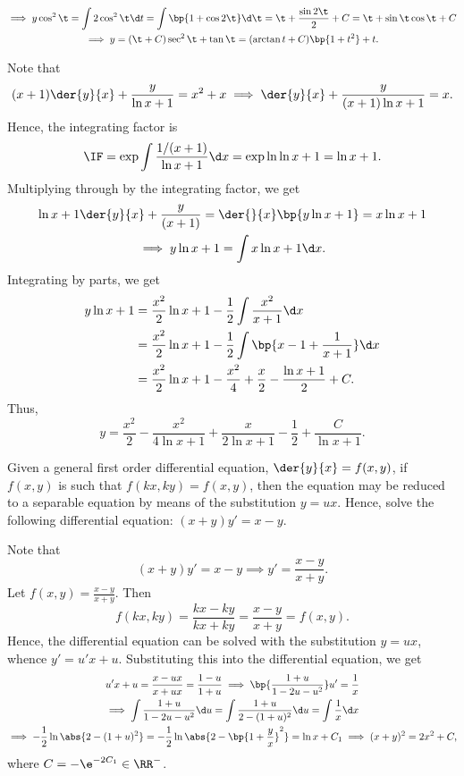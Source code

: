 \begin{solution}
\begin{ppart}
\begin{gather*}
            \implies y \cos^2 \t = \int 2\cos^2 \t \d t = \int \bp{1 + \cos 2\t} \d \t = \t + \frac{\sin 2\t}{2} + C = \t + \sin \t \cos \t + C\\
            \implies y = (\t + C)\sec^2 \t + \tan \t = (\arctan t + C)\bp{1 + t^2} + t.
        \end{gather*}
    \end{ppart}
    \begin{ppart}
        Note that \[(x+1)\der{y}{x} + \frac{y}{\ln{x+1}} = x^2 + x \implies \der{y}{x} + \frac{y}{(x+1)\ln{x+1}} = x.\] Hence, the integrating factor is \[\IF = \exp \int \frac{1/(x+1)}{\ln{x+1}} \d x = \exp \ln \ln{x+1} = \ln{x+1}.\] Multiplying through by the integrating factor, we get
        \begin{gather*}
            \ln{x+1} \der{y}{x} + \frac{y}{(x+1)} = \der{}{x} \bp{y\ln{x+1}} = x\ln{x+1}\\
            \implies y\ln{x+1} = \int x\ln{x+1} \d x.
        \end{gather*}
        Integrating by parts, we get
        \begin{align*}
            y \ln{x+1} &= \frac{x^2}2 \ln{x+1} - \frac12 \int \frac{x^2}{x+1} \d x \\
            &= \frac{x^2}2 \ln{x+1} - \frac12 \int \bp{x - 1 + \frac1{x+1}} \d x \\
            &= \frac{x^2}2 \ln{x+1} - \frac{x^2}4 + \frac{x}2 - \frac{\ln{x+1}}2 + C.
        \end{align*}
        Thus, \[y = \frac{x^2}2  - \frac{x^2}{4\ln{x+1}} + \frac{x}{2\ln{x+1}} - \frac12 + \frac{C}{\ln{x+1}}.\]
    \end{ppart}
\end{solution}

\begin{problem}
    Given a general first order differential equation, $\der{y}{x} = f(x, y)$, if $f(x, y)$ is such that $f(kx, ky) = f(x, y)$, then the equation may be reduced to a separable equation by means of the substitution $y = ux$. Hence, solve the following differential equation: $(x+y)y' = x-y$.
\end{problem}
\begin{solution}
    Note that \[(x+y)y' = x-y \implies y' = \frac{x-y}{x+y}.\]Let $f(x, y) = \frac{x-y}{x+y}$. Then \[f(kx, ky) = \frac{kx-ky}{kx+ky} = \frac{x-y}{x+y} = f(x, y).\] Hence, the differential equation can be solved with the substitution $y = ux$, whence $y' = u' x + u$. Substituting this into the differential equation, we get
    \begin{gather*}
        u' x + u = \frac{x - ux}{x + ux} = \frac{1-u}{1 + u} \implies \bp{\frac{1 + u}{1 - 2u - u^2}} u' = \frac1x \\
        \implies \int \frac{1 + u}{1 - 2u - u^2} \d u = \int \frac{1+u}{2-(1+u)^2} \d u = \int \frac1x \d x \\
        \implies -\frac12 \ln \abs{2 - (1+u)^2} = -\frac12 \ln \abs{2 - \bp{1 + \frac{y}{x}}^2} = \ln x + C_1 \implies (x + y)^2 = 2x^2 + C,
    \end{gather*}
    where $C = -\e^{-2C_1} \in \RR^-$.
\end{solution}

